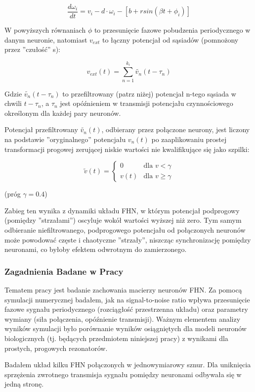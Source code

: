   \begin{equation} \label{eq:w2}
    \frac{d \omega_i}{dt} = v_i - d \cdot \omega_i - [b + r sin(\beta t + \phi_i)]
  \end{equation}

  W powyższych równaniach $\phi$ to przesunięcie fazowe pobudzenia periodycznego w danym neuronie, natomiast $v_{ext}$ to łączny potencjał od sąsiadów (pomnożony przez ''czułość'' s):

  \begin{equation}
    v_{ext}(t) = \displaystyle\sum\limits_{n=1}^{k_i} \widetilde{v_{n}}(t-\tau_{n})
  \end{equation}

  Gdzie $\widetilde{v_{n}}(t-\tau_{n})$ to przefiltrowany (patrz niżej) potencjał n-tego sąsiada w chwili $t-\tau_{n}$, a $\tau_{n}$ jest opóźnieniem w transmisji potencjału czynnościowego określonym dla każdej pary neuronów.

  Potencjał przefiltrowany $\widetilde{v_{n}}(t)$, odbierany przez połączone neurony, jest liczony na podstawie ''oryginalnego'' potencjału $v_{n}(t)$ po zaaplikowaniu prostej transformacji progowej zerującej niskie wartości nie kwalifikujące się jako szpilki:

  \begin{equation}
    \tilde{v}(t) = 
    \begin{cases}
      0 & \text{dla } v < \gamma \\
      v(t) & \text{dla } v \geq \gamma 
    \end{cases}
  \end{equation}

  (próg $\gamma = 0.4$)

  Zabieg ten wynika z dynamiki układu FHN, w którym potencjał podprogowy (pomiędzy ''strzałami'') oscyluje wokół wartości wyższej niż zero. Tym samym odbieranie niefiltrowanego, podprogowego potencjału od połączonych neuronów może powodować częste i chaotyczne ''strzały'', niszcząc synchronizację pomiędzy neuronami, co byłoby efektem odwrotnym do zamierzonego.
  
  \subsubsection{Zagadnienia Badane w Pracy}

  Tematem pracy jest badanie zachowania macierzy neuronów FHN. Za pomocą symulacji numerycznej badałem, jak na signal-to-noise ratio wpływa przesunięcie fazowe sygnału periodycznego (rozciągłość przestrzenna układu) oraz parametry wymiany (siła połączenia, opóźnienie transmisji). Ważnym elementem analizy wyników symulacji było porównanie wyników osiągniętych dla modeli neuronów biologicznych (tj. będących przedmiotem niniejszej pracy) z wynikami dla prostych, progowych rezonatorów.

  Badałem układ kilku FHN połączonych w jednowymiarowy sznur. Dla uniknięcia sprzężenia zwrotnego  transmisja sygnału pomiędzy neuronami odbywała się w jedną stronę.
